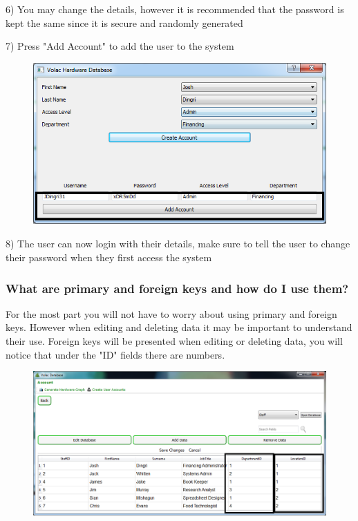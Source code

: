 6) You may change the details, however it is recommended that the password is kept the same since it is secure and randomly generated

7) Press "Add Account" to add the user to the system

\begin{figure}[H]
    \includegraphics[width=\textwidth]{./Manual/Images/account4.png}
\end{figure}

8) The user can now login with their details, make sure to tell the user to change their password when they first access the system

\subsubsection{What are primary and foreign keys and how do I use them?}\label{keys}

For the most part you will not have to worry about using primary and foreign keys. However when editing and deleting data it may be important to understand their use. Foreign keys will be presented when editing or deleting data, you will notice that under the "ID" fields there are numbers.

\begin{figure}[H]
    \includegraphics[width=\textwidth]{./Manual/Images/foreign.png}
\end{figure}

